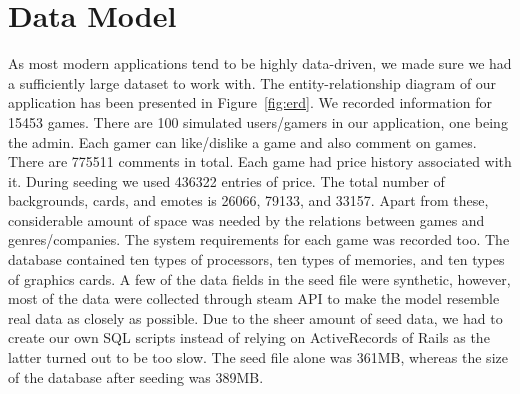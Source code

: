 \section{Data Model}
As most modern applications tend to be highly data-driven, we made sure we had a sufficiently large dataset to work with. The entity-relationship diagram of our application has been presented in Figure~\ref{fig:erd}. We recorded information for 15453 games. There are 100 simulated users/gamers in our application, one being the admin. Each gamer can like/dislike a game and also comment on games. There are 775511 comments in total. Each game had price history associated with it. During seeding we used 436322 entries of price. The total number of backgrounds, cards, and emotes is 26066, 79133, and 33157. Apart from these, considerable amount of space was needed by the relations between games and genres/companies. The system requirements for each game was recorded too. The database contained ten types of processors, ten types of memories, and ten types of graphics cards. A few of the data fields in the seed file were synthetic, however, most of the data were collected through steam API to make the model resemble real data as closely as possible. Due to the sheer amount of seed data, we had to create our own SQL scripts instead of relying on ActiveRecords of Rails as the latter turned out to be too slow. The seed file alone was 361MB, whereas the size of the database after seeding was 389MB.
